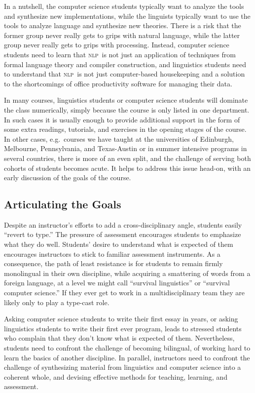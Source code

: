 \documentclass[11pt]{article}
\newcommand{\NLP}{\textsc{nlp}}
\begin{document}
In a nutshell, the computer science students typically want to analyze
the tools and synthesize new implementations, while the linguists
typically want to use the tools to analyze language and
synthesize new theories.  There is a risk that the former group
never really gets to grips with natural language, while the latter
group never really gets to grips with processing.  Instead,
computer science students need to learn that \NLP\ is not just an
application of techniques from formal language theory and compiler
construction, and linguistics students need to understand that \NLP\ is not
just computer-based housekeeping and a solution to the shortcomings of
office productivity software for managing their data.

In many courses, linguistics students or computer science students
will dominate the class numerically, simply because the course is only
listed in one department.  In such cases it is usually enough to
provide additional support in the form of some extra readings,
tutorials, and exercises in the opening stages of the course.  In
other cases, e.g.\ courses we have taught at the universities of
Edinburgh, Melbourne, Pennsylvania, and Texas-Austin or in summer
intensive programs in several countries, there is more of an even
split, and the challenge of serving both cohorts of students becomes
acute.  It helps to address this issue head-on, with an early
discussion of the goals of the course.

\subsection{Articulating the Goals}

Despite an instructor's efforts to add a cross-disciplinary angle, students
easily ``revert to type.''  The pressure of assessment encourages students to emphasize
what they do well.  Students' desire to understand what is expected of them encourages
instructors to stick to familiar assessment instruments.  As a consequence,
the path of least resistance is for students to remain firmly
monolingual in their own discipline, while
acquiring a smattering of words from a foreign language, at a level we might
call ``survival linguistics'' or ``survival computer science.''
If they ever get to work in a multidisciplinary team they are likely
only to play a type-cast role.

Asking computer science students to write their first essay in years,
or asking linguistics students to write their first ever program,
leads to stressed students who complain that they don't know what is
expected of them.  Nevertheless, students need to confront the
challenge of becoming bilingual, of working hard to learn the basics
of another discipline.  In parallel, instructors need to confront the
challenge of synthesizing material from linguistics and computer
science into a coherent whole, and devising effective methods for
teaching, learning, and assessment.
\end{document}
